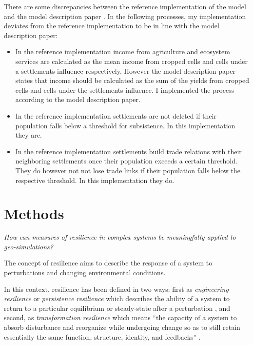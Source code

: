 There are some discrepancies between the reference implementation of the model \cite{Heckbert2013model} and the model description paper \cite{Heckbert2013}. In the following processes, my implementation deviates from the reference implementation to be in line with the model description paper: 

\begin{itemize}
    \item In the reference implementation income from agriculture and ecosystem services are calculated as the mean income from cropped cells and cells under a settlements influence respectively. However the model description paper states that income should be calculated as the sum of the yields from cropped cells and cells under the settlements influence. I implemented the process according to the model description paper.
    \item In the reference implementation settlements are not deleted if their population falls below a threshold for subsistence. In this implementation they are.
    \item In the reference implementation settlements build trade relations with their neighboring settlements once their population exceeds a certain threshold. They do however not not lose trade links if their population falls below the respective threshold. In this implementation they do.
\end{itemize}

\section{Methods}
\textit{How can measures of resilience in complex systems be meaningfully applied to geo-simulations?}

The concept of resilience \citep{Holling1973} aims to describe the response of a system to perturbations and changing environmental conditions. 

In this context, resilience has been defined in two ways: 
first as \emph{engineering resilience} or \emph{persistence resilience} which describes the ability of a system to return to a particular equilibrium or steady-state after a perturbation \citep{Holling1973, Gunderson2000}, and
second, as \emph{transformation resilience} which means ``the capacity of a system to absorb disturbance and reorganize while undergoing change so as to still retain essentially the same function, structure, identity, and feedbacks'' \citep{Walker2004}.

